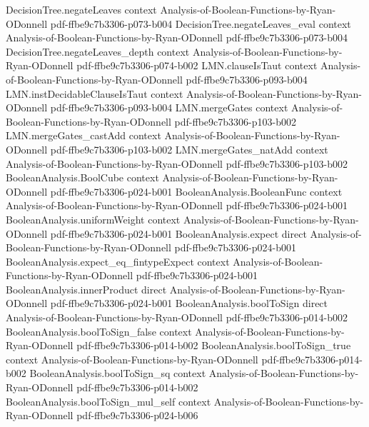 \begin{theorem}
\proofstep
  {DecisionTree.negateLeaves}
  {context}
  {Analysis-of-Boolean-Functions-by-Ryan-ODonnell}
  {pdf-ffbe9c7b3306-p073-b004}
\proofstep
  {DecisionTree.negateLeaves_eval}
  {context}
  {Analysis-of-Boolean-Functions-by-Ryan-ODonnell}
  {pdf-ffbe9c7b3306-p073-b004}
\proofstep
  {DecisionTree.negateLeaves_depth}
  {context}
  {Analysis-of-Boolean-Functions-by-Ryan-ODonnell}
  {pdf-ffbe9c7b3306-p074-b002}
\proofstep
  {LMN.clauseIsTaut}
  {context}
  {Analysis-of-Boolean-Functions-by-Ryan-ODonnell}
  {pdf-ffbe9c7b3306-p093-b004}
\proofstep
  {LMN.instDecidableClauseIsTaut}
  {context}
  {Analysis-of-Boolean-Functions-by-Ryan-ODonnell}
  {pdf-ffbe9c7b3306-p093-b004}
\proofstep
  {LMN.mergeGates}
  {context}
  {Analysis-of-Boolean-Functions-by-Ryan-ODonnell}
  {pdf-ffbe9c7b3306-p103-b002}
\proofstep
  {LMN.mergeGates_castAdd}
  {context}
  {Analysis-of-Boolean-Functions-by-Ryan-ODonnell}
  {pdf-ffbe9c7b3306-p103-b002}
\proofstep
  {LMN.mergeGates_natAdd}
  {context}
  {Analysis-of-Boolean-Functions-by-Ryan-ODonnell}
  {pdf-ffbe9c7b3306-p103-b002}
\proofstep
  {BooleanAnalysis.BoolCube}
  {context}
  {Analysis-of-Boolean-Functions-by-Ryan-ODonnell}
  {pdf-ffbe9c7b3306-p024-b001}
\proofstep
  {BooleanAnalysis.BooleanFunc}
  {context}
  {Analysis-of-Boolean-Functions-by-Ryan-ODonnell}
  {pdf-ffbe9c7b3306-p024-b001}
\proofstep
  {BooleanAnalysis.uniformWeight}
  {context}
  {Analysis-of-Boolean-Functions-by-Ryan-ODonnell}
  {pdf-ffbe9c7b3306-p024-b001}
\proofstep
  {BooleanAnalysis.expect}
  {direct}
  {Analysis-of-Boolean-Functions-by-Ryan-ODonnell}
  {pdf-ffbe9c7b3306-p024-b001}
\proofstep
  {BooleanAnalysis.expect_eq_fintypeExpect}
  {context}
  {Analysis-of-Boolean-Functions-by-Ryan-ODonnell}
  {pdf-ffbe9c7b3306-p024-b001}
\proofstep
  {BooleanAnalysis.innerProduct}
  {direct}
  {Analysis-of-Boolean-Functions-by-Ryan-ODonnell}
  {pdf-ffbe9c7b3306-p024-b001}
\proofstep
  {BooleanAnalysis.boolToSign}
  {direct}
  {Analysis-of-Boolean-Functions-by-Ryan-ODonnell}
  {pdf-ffbe9c7b3306-p014-b002}
\proofstep
  {BooleanAnalysis.boolToSign_false}
  {context}
  {Analysis-of-Boolean-Functions-by-Ryan-ODonnell}
  {pdf-ffbe9c7b3306-p014-b002}
\proofstep
  {BooleanAnalysis.boolToSign_true}
  {context}
  {Analysis-of-Boolean-Functions-by-Ryan-ODonnell}
  {pdf-ffbe9c7b3306-p014-b002}
\proofstep
  {BooleanAnalysis.boolToSign_sq}
  {context}
  {Analysis-of-Boolean-Functions-by-Ryan-ODonnell}
  {pdf-ffbe9c7b3306-p014-b002}
\proofstep
  {BooleanAnalysis.boolToSign_mul_self}
  {context}
  {Analysis-of-Boolean-Functions-by-Ryan-ODonnell}
  {pdf-ffbe9c7b3306-p024-b006}
\proofstep

\end{theorem}
